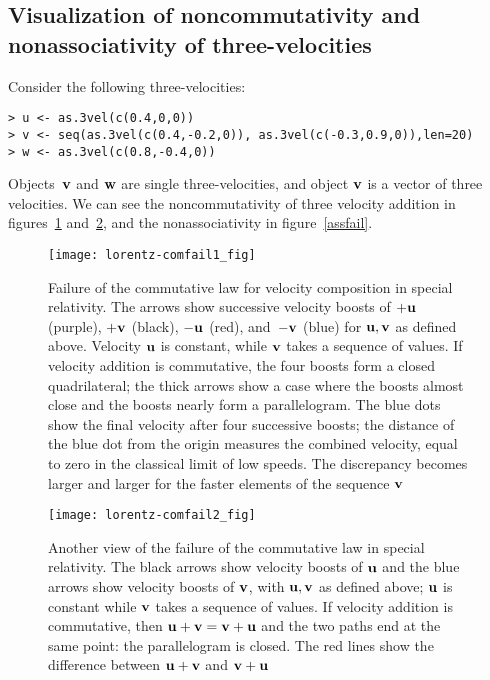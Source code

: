 \documentclass[ijoc,nonblindrev]{informs3} %
\begin{document}
\subsection{Visualization of noncommutativity and nonassociativity of three-velocities}

Consider the following three-velocities:

\begin{verbatim}
> u <- as.3vel(c(0.4,0,0))
> v <- seq(as.3vel(c(0.4,-0.2,0)), as.3vel(c(-0.3,0.9,0)),len=20)
> w <- as.3vel(c(0.8,-0.4,0))

\end{verbatim}

Objects~$\mathbf v$ and $\mathbf w$ are single three-velocities, and object $\mathbf v$
 is a vector of three velocities.  We can see the noncommutativity of
 three velocity addition in figures~\ref{comfail1} and~\ref{comfail2},
 and the nonassociativity in figure~\ref{assfail}.

\begin{figure}[htbp]
  \begin{center}
\texttt{[image: lorentz-comfail1\_fig]}
\caption{Failure\label{comfail1} of the commutative law for velocity
  composition in special relativity.  The arrows show successive
  velocity boosts of $+\mathbf u$ (purple), $+\mathbf v$ (black), $-\mathbf u$ (red),
  and~$-\mathbf v$ (blue) for $\mathbf u,\mathbf v$ as defined above.  Velocity $\mathbf u$ is
  constant, while $\mathbf v$ takes a sequence of values.  If velocity
  addition is commutative, the four boosts form a closed
  quadrilateral; the thick arrows show a case where the boosts almost
  close and the boosts nearly form a parallelogram.  The blue dots
  show the final velocity after four successive boosts; the distance
  of the blue dot from the origin measures the combined velocity,
  equal to zero in the classical limit of low speeds.  The discrepancy
  becomes larger and larger for the faster elements of the sequence
  $\mathbf v$}
  \end{center}
\end{figure}

\begin{figure}[htbp]
  \begin{center}
\texttt{[image: lorentz-comfail2\_fig]}
\caption{Another view of the failure of the commutative
  law\label{comfail2} in special relativity.  The black arrows show
  velocity boosts of $\mathbf u$ and the blue arrows show velocity boosts of
  $\mathbf v$, with $\mathbf u,\mathbf v$ as defined above; $\mathbf u$ is constant while
  $\mathbf v$ takes a sequence of values.  If velocity addition is
  commutative, then $\mathbf u+\mathbf v=\mathbf v+\mathbf u$ and the two paths end at the
  same point: the parallelogram is closed.  The red lines show the
  difference between $\mathbf u+\mathbf v$ and $\mathbf v+\mathbf u$}
  \end{center}
\end{figure}
\end{document}
